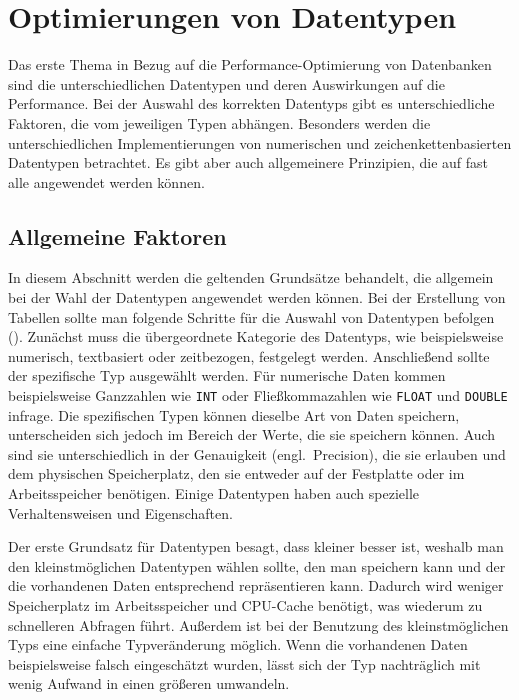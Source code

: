 
\chapter{Optimierungen von Datentypen}\label{ch:data-types}

Das erste Thema in Bezug auf die Performance-Optimierung von Datenbanken sind die unterschiedlichen Datentypen und deren Auswirkungen auf die Performance.
Bei der Auswahl des korrekten Datentyps gibt es unterschiedliche Faktoren, die vom jeweiligen Typen abhängen.
Besonders werden die unterschiedlichen Implementierungen von numerischen und zeichenkettenbasierten Datentypen betrachtet.
Es gibt aber auch allgemeinere Prinzipien, die auf fast alle angewendet werden können.

\section{Allgemeine Faktoren}\label{sec:data-types-allgemeine-faktoren}

In diesem Abschnitt werden die geltenden Grundsätze behandelt, die allgemein bei der Wahl der Datentypen angewendet werden können.
Bei der Erstellung von Tabellen sollte man folgende Schritte für die Auswahl von Datentypen befolgen (\cite[S. 115--145]{schwartz2012high}).
Zunächst muss die übergeordnete Kategorie des Datentyps, wie beispielsweise numerisch, textbasiert oder zeitbezogen, festgelegt werden.
Anschließend sollte der spezifische Typ ausgewählt werden.
Für numerische Daten kommen beispielsweise Ganzzahlen wie \texttt{INT} oder Fließkommazahlen wie \texttt{FLOAT} und \texttt{DOUBLE} infrage.
Die spezifischen Typen können dieselbe Art von Daten speichern, unterscheiden sich jedoch im Bereich der Werte, die sie speichern können.
Auch sind sie unterschiedlich in der Genauigkeit (engl.\ Precision), die sie erlauben und dem physischen Speicherplatz, den sie entweder auf der Festplatte oder im Arbeitsspeicher benötigen.
Einige Datentypen haben auch spezielle Verhaltensweisen und Eigenschaften.

Der erste Grundsatz für Datentypen besagt, dass kleiner besser ist, weshalb man den kleinstmöglichen Datentypen wählen sollte, den man speichern kann und der die vorhandenen Daten entsprechend repräsentieren kann.
Dadurch wird weniger Speicherplatz im Arbeitsspeicher und CPU-Cache benötigt, was wiederum zu schnelleren Abfragen führt.
Außerdem ist bei der Benutzung des kleinstmöglichen Typs eine einfache Typveränderung möglich.
Wenn die vorhandenen Daten beispielsweise falsch eingeschätzt wurden, lässt sich der Typ nachträglich mit wenig Aufwand in einen größeren umwandeln.

